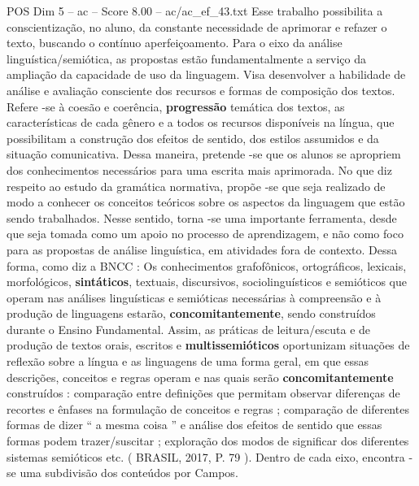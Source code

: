 \begin{textsample}{POS Dim 5 – ac – Score 8.00 – ac/ac\_ef\_43.txt}
Esse trabalho possibilita a conscientização, no aluno, da constante necessidade de aprimorar e refazer o texto, buscando o contínuo aperfeiçoamento.
Para o eixo da análise linguística/semiótica, as propostas estão fundamentalmente a serviço da ampliação da capacidade de uso da linguagem.
Visa desenvolver a habilidade de análise e avaliação consciente dos recursos e formas de composição dos textos.
Refere -se à coesão e coerência, \textbf{progressão} temática dos textos, as características de cada gênero e a todos os recursos disponíveis na língua, que possibilitam a construção dos efeitos de sentido, dos estilos assumidos e da situação comunicativa.
Dessa maneira, pretende -se que os alunos se apropriem dos conhecimentos necessários para uma escrita mais aprimorada.
No que diz respeito ao estudo da gramática normativa, propõe -se que seja realizado de modo a conhecer os conceitos teóricos sobre os aspectos da linguagem que estão sendo trabalhados.
Nesse sentido, torna -se uma importante ferramenta, desde que seja tomada como um apoio no processo de aprendizagem, e não como foco para as propostas de análise linguística, em atividades fora de contexto.
Dessa forma, como diz a BNCC : Os conhecimentos grafofônicos, ortográficos, lexicais, morfológicos, \textbf{sintáticos}, textuais, discursivos, sociolinguísticos e semióticos que operam nas análises linguísticas e semióticas necessárias à compreensão e à produção de linguagens estarão, \textbf{concomitantemente}, sendo construídos durante o Ensino Fundamental.
Assim, as práticas de leitura/escuta e de produção de textos orais, escritos e \textbf{multissemióticos} oportunizam situações de reflexão sobre a língua e as linguagens de uma forma geral, em que essas descrições, conceitos e regras operam e nas quais serão \textbf{concomitantemente} construídos : comparação entre definições que permitam observar diferenças de recortes e ênfases na formulação de conceitos e regras ; comparação de diferentes formas de dizer “ a mesma coisa ” e análise dos efeitos de sentido que essas formas podem trazer/suscitar ; exploração dos modos de significar dos diferentes sistemas semióticos etc. ( BRASIL, 2017, P. 79 ).
Dentro de cada eixo, encontra -se uma subdivisão dos conteúdos por Campos.

\end{textsample}
